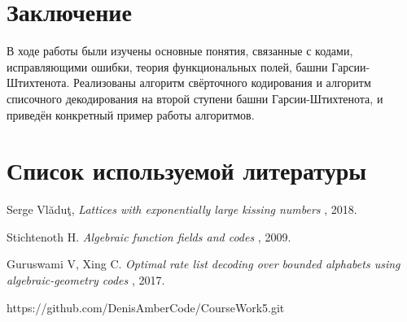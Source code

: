 \documentclass{article}
\numberwithin{equation}{section}
\begin{document}
\newpage
\section { Заключение }
В ходе работы были изучены основные понятия, связанные с кодами, исправляющими ошибки, теория функциональных полей, башни Гарсии-Штихтенота. Реализованы алгоритм свёрточного кодирования и алгоритм списочного декодирования на второй ступени башни Гарсии-Штихтенота, и приведён конкретный пример работы алгоритмов.

\newpage

\section { Список используемой литературы }

\bigskip \noindent [Vla] Serge Vlăduţ, {\em Lattices with exponentially large kissing numbers }, 2018.

\medskip\noindent [Sti] Stichtenoth H. {\em Algebraic function fields and codes }, 2009.

\medskip\noindent [GX] Guruswami V, Xing C. {\em Optimal rate list decoding over bounded alphabets using
algebraic-geometry codes }, 2017.

\medskip\noindent [Alg] https://github.com/DenisAmberCode/CourseWork5.git
\end{document}
